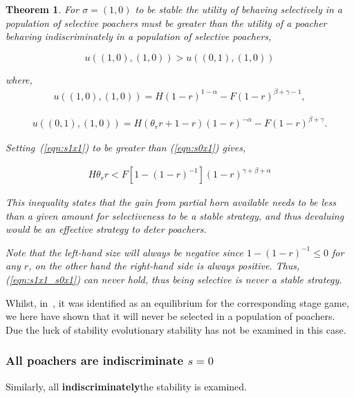 \documentclass[10pt]{article}
\newtheorem{theorem}{Theorem}
\begin{document}
\begin{theorem}
	For \(\sigma=(1, 0)\) to be stable the utility of behaving selectively in 
	a population of selective poachers 	must be greater than the utility of a 
	poacher behaving indiscriminately in a population of selective poachers,

	\begin{equation}
	u((1, 0),(1, 0)) > u((0, 1),(1, 0))
	\end{equation}

	where,
	\begin{eqnarray}
	\label{eqn:s1x1}
 	u((1, 0),(1, 0)) = H(1 - r)^{1 - \alpha} - F(1 - r)^{\beta + \gamma - 1},
	\end{eqnarray}

	\begin{eqnarray}
	\label{eqn:s0x1}
	u((0, 1),(1, 0)) = H(\theta_r r +1 - r)(1 - r)^{-\alpha} - F(1 - r)^{\beta + \gamma} .
	\end{eqnarray}

	Setting~(\ref{eqn:s1x1}) to be greater than (\ref{eqn:s0x1}) gives,

	\begin{eqnarray}
	\label{eqn:s1x1_s0x1}
	H \theta_r r < F [1 - (1 - r)^{-1}](1 - r)^{\gamma + \beta + \alpha}
	\end{eqnarray}


	This inequality states that the gain from partial horn available needs to be less
	than a given amount for selectiveness to be a stable strategy, and thus devaluing
	would be  an effective strategy to deter poachers.

	Note that the left-hand size  will always be negative since \(1-(1-r)^{-1} \leq 0\)
	for any \(r\), on the other hand the right-hand side is always positive.
	Thus, (\ref{eqn:s1x1_s0x1}) can never hold, thus being selective is never
	a stable strategy.
\end{theorem}

Whilst, in~\cite{Lee}, it was identified as an equilibrium for the corresponding
stage game, we here have shown that it will never be selected in a population 
of poachers. Due the luck of stability evolutionary stability has not be examined
in this case.

\subsubsection{All poachers are indiscriminate \(s=0\)}

Similarly, all \textbf{indiscriminately}the stability is examined.
\end{document}
